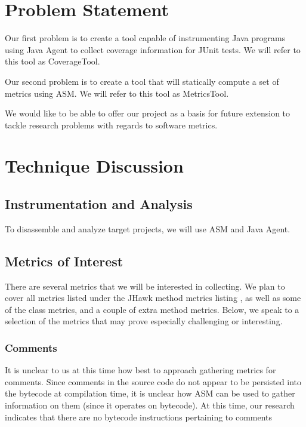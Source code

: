\section{Problem Statement}

Our first problem is to create a tool capable of instrumenting Java programs using Java Agent to collect coverage information for JUnit tests. We will refer to this tool as CoverageTool.

Our second problem is to create a tool that will statically compute a set of metrics using ASM. We will refer to this tool as MetricsTool.

We would like to be able to offer our project as a basis for future extension to tackle research problems with regards to software metrics.

\section{Technique Discussion}

\subsection{Instrumentation and Analysis}

To disassemble and analyze target projects, we will use ASM and Java Agent.

\subsection{Metrics of Interest}

There are several metrics that we will be interested in  collecting. We plan to cover all metrics listed under the JHawk method metrics listing \cite{jhawkmetrics}, as well as some of the class metrics, and a couple of extra method metrics. Below, we speak to a selection of the metrics that may prove especially challenging or interesting.

\subsubsection{Comments}

It is unclear to us at this time how best to approach gathering metrics for comments. Since comments in the source code do not appear to be persisted into the bytecode at compilation time, it is unclear how ASM can be used to gather information on them (since it operates on bytecode). At this time, our research indicates that there are no bytecode instructions pertaining to comments 

